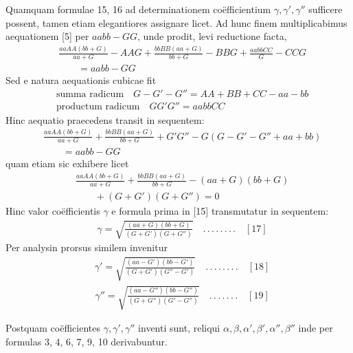 Quamquam formulae 15, 16 ad determinationem coëfficientium $\gamma,\gamma',\gamma''$
sufficere possent, tamen etiam elegantiores assignare licet. Ad hunc finem multiplicabimus aequationem [5] per $aabb-GG$, unde prodit, levi reductione facta,
\[
\begin{aligned}
&\frac{aaAA(bb+G)}{aa+G}-AAG+\frac{bbBB(aa+G)}{bb+G}-BBG+\frac{aabbCC}{G}-CCG\\[6pt]
&\qquad{}=aabb-GG
\end{aligned}
\]
Sed e natura aequationis cubicae fit
\[
\begin{aligned}
&\text{summa radicum}\quad G-G'-G''=AA+BB+CC-aa-bb\\[8pt]
&\text{productum radicum}\quad GG'G''=aabbCC
\end{aligned}
\]
Hinc aequatio praecedens transit in sequentem:
\[
\begin{aligned}
&\frac{aaAA(bb+G)}{aa+G}+\frac{bbBB(aa+G)}{bb+G}+G'G''-G(G-G'-G''+aa+bb)\\[6pt]
&\qquad{}=aabb-GG
\end{aligned}
\]
quam etiam sic exhibere licet
\[
\begin{aligned}
&\frac{aaAA(bb+G)}{aa+G}+\frac{bbBB(aa+G)}{bb+G}-(aa+G)(bb+G)\\[6pt]
&\qquad{}+(G+G')(G+G'')=0
\end{aligned}
\]
Hinc valor coëfficientis $\gamma$ e formula prima in [15] transmutatur in sequentem:
\[
\begin{aligned}
&\gamma=\surd{\frac{(aa+G)(bb+G)}{(G+G')(G+G'')}}\quad.\,.\,.\,.\,.\,.\,.\,.\quad[17]
\end{aligned}
\]
Per analysin prorsus similem invenitur
\[
\begin{aligned}
&\gamma'=\surd{\frac{(aa-G')(bb-G')}{(G+G')(G''-G')}}\quad.\,.\,.\,.\,.\,.\,.\,.\quad[18]
\end{aligned}
\]
\[
\begin{aligned}
&\gamma''=\surd{\frac{(aa-G'')(bb-G'')}{(G+G'')(G'-G'')}}\quad.\,.\,.\,.\,.\,.\,.\quad[19]
\end{aligned}
\]
\par Postquam coëfficientes $\gamma,\gamma',\gamma''$ inventi sunt, reliqui $\alpha,\beta,\alpha',\beta',\alpha'',\beta''$
inde per formulas 3, 4, 6, 7, 9, 10 derivabuntur.

